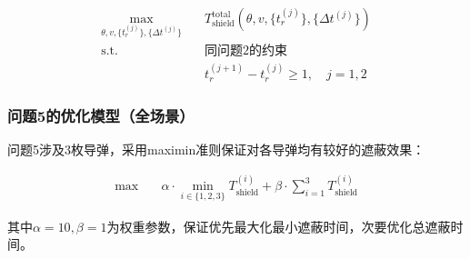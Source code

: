 \begin{align}
    \max_{\theta, v, \{t_r^{(j)}\}, \{\Delta t^{(j)}\}} \quad & T_{\text{shield}}^{\text{total}}(\theta, v, \{t_r^{(j)}\}, \{\Delta t^{(j)}\}) \\
    \text{s.t.} \quad & \text{同问题2的约束} \\
    & t_r^{(j+1)} - t_r^{(j)} \ge 1,\quad j=1,2
\end{align}

\subsubsection{问题5的优化模型（全场景）}

问题5涉及3枚导弹，采用maximin准则保证对各导弹均有较好的遮蔽效果：

\begin{align}
    \max \quad & \alpha \cdot \min_{i \in \{1,2,3\}} T_{\text{shield}}^{(i)} + \beta \cdot \sum_{i=1}^{3} T_{\text{shield}}^{(i)}
\end{align}

其中$\alpha=10, \beta=1$为权重参数，保证优先最大化最小遮蔽时间，次要优化总遮蔽时间。
